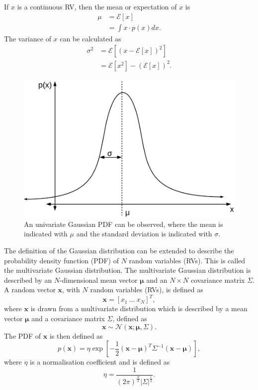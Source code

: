 \documentclass[12pt,oneside,openany,a4paper, %
afrikaans,english,
]{memoir}
\numberwithin{equation}{chapter}
\begin{document}
{If $x$ is a continuous RV, then the mean or expectation of $x$ is
\begin{equation}
\begin{split}
\mu & = \mathcal{E}\left[ x \right] \\
& = \int x \cdot p(x)dx.
\end{split}
\end{equation}
The variance of $x$ can be calculated as
\begin{equation}
\begin{split}
\sigma^2 & = \mathcal{E}\left[\left(x - \mathcal{E}[x]\right)^2\right]\\
& = \mathcal{E}[x^2] - (\mathcal{E}[x])^2.
\end{split}
\end{equation}
\begin{figure}[H]
  \includegraphics[width=0.6\linewidth]{Figures/univariate.png}
  \centering
  \caption[Univariate Gaussian PDF]{An univariate Gaussian PDF can be observed, where the mean is indicated with $\mu$ and the standard deviation is indicated with $\sigma$.}
  \label{fig:gPDF1}
\end{figure}
The definition of the Gaussian distribution can be extended to describe the probability density function (PDF) of $N$ random variables (RVs). This is called the multivariate Gaussian distribution. The multivariate Gaussian distribution is described by an $N$-dimensional mean vector $\bm{\mu}$ and an $N\times N$ covariance matrix $\Sigma$. A random vector $\bm{x}$, with $N$ random variables (RVs), is defined as
\begin{equation}
\bm{x} = [x_1\ ...\ x_N]^T,
\end{equation}
where $\bm{x}$ is drawn from a multivariate distribution which is described by a mean vector $\bm{\mu}$ and a covariance matrix $\Sigma$, defined as
\begin{equation}
\bm{x} \sim \mathcal{N}(\bm{x}; \bm{\mu},\Sigma).
\end{equation}
The PDF of $\bm{x}$ is then defined as
\begin{equation}\label{eq:3}
p(\bm{x})  = \eta\exp\left[-\frac{1}{2}(\bm{x}-\bm{\mu})^T\Sigma^{-1}(\bm{x}-\bm{\mu})\right],
\end{equation}
where $\eta$ is a normalisation coefficient and is defined as
\begin{equation}\label{eq:4}
\eta = \frac{1}{(2\pi)^{\frac{N}{2}}|\Sigma|^{\frac{1}{2}}}.
\end{equation}

}
\end{document}
